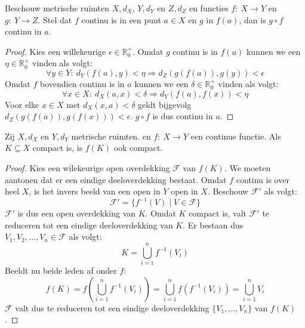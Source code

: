 \documentclass[main.tex]{subfiles}
\begin{document}
\begin{bpr}
  Beschouw metrische ruimten $X,d_{X}$, $Y,d_{Y}$ en $Z,d_{Z}$ en functies $f:\ X \rightarrow  Y$ en $g:\ Y \rightarrow Z$.
  Stel dat $f$ continu is in een punt $a\in X$ en $g$ in $f(a)$, dan is $g\circ f$ continu in $a$.

  \begin{proof}
    Kies een willekeurige $\epsilon\in \mathbb{R}_{0}^{+}$.
    Omdat $g$ continu is in $f(a)$ kunnen we een $\eta \in \mathbb{R}_{0}^{+}$ vinden als volgt:
    \[ \forall y\in Y:\ d_{Y}(f(a),y) < \eta \Rightarrow d_{Z}(g(f(a)),g(y)) < \epsilon \]
    Omdat $f$ bovendien continu is in $a$ kunnen we een $\delta \in \mathbb{R}_{0}^{+}$ vinden als volgt:
    \[ \forall x\in X:\ d_{X}(a,x) < \delta \Rightarrow d_{Y}(f(a),f(x)) < \eta \]
    Voor elke $x\in X$ met $d_{X}(x,a) < \delta$ geldt bijgevolg $d_{Z}\left(g(f(a)),g(f(x))\right) < \epsilon$.
    $g\circ f$ is dus continu in $a$.
  \end{proof}
\end{bpr}

\begin{bst}
  \label{st:beeld-van-compact-ook-compact}
  Zij $X,d_{X}$ en $Y,d_{Y}$ metrische ruimten. en $f:\ X \rightarrow Y$ een continue functie.
  Als $K \subseteq X$ compact is, is $f(K)$ ook compact.

  \begin{proof}
    Kies een wilekeurige open overdekking $\mathcal{F}$ van $f(K)$.
    We moeten aantonen dat er een eindige deeloverdekking bestaat.
    Omdat $f$ continu is over heel $X$, is het invers beeld van een open in $Y$ open in $X$.
    Beschouw $\mathcal{F}'$ als volgt:
    \[ \mathcal{F}' = \{ f^{-1}(V) \mid V \in \mathcal{F} \} \]
    $\mathcal{F}'$ is dus een open overdekking van $K$.
    Omdat $K$ compact is, valt $\mathcal{F}'$ te reduceren tot een eindige deeloverdekking van $K$.
    Er bestaan dus $V_{1},V_{2},\dotsc,V_{n} \in \mathcal{F}$ als volgt:
    \[ K = \bigcup_{i=1}^{n}f^{-1}(V_{i}) \]
    Beeldt nu beide leden af onder $f$:
    \[ f(K) = f\left( \bigcup_{i=1}^{n}f^{-1}(V_{i}) \right) = \bigcup_{i=1}^{n}f\left(f^{-1}(V_{i})\right) = \bigcup_{i=1}^{n}V_{i} \]
    $\mathcal{F}$ valt dus te reduceren tot een eindige deeloverdekking $\{V_{1},\dotsc,V_{n}\}$ van $f(K)$.
  \end{proof}
\end{bst}
\end{document}
